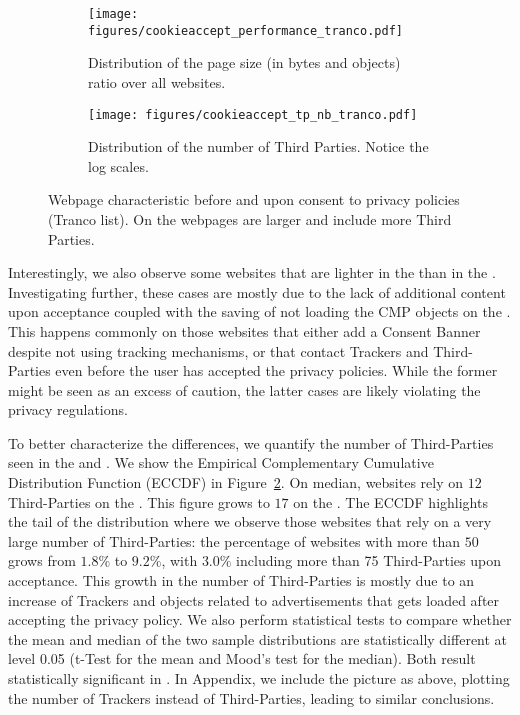 \begin{figure}[!t]
    \centering
    \begin{subfigure}[t]{0.495\columnwidth}
        \texttt{[image: figures/cookieaccept\_performance\_tranco.pdf]}
        \caption{Distribution of the page size (in bytes and objects) ratio over all websites.}
        \label{fig:ca_perf_size}
    \end{subfigure}
    \begin{subfigure}[t]{0.495\columnwidth}
        \texttt{[image: figures/cookieaccept\_tp\_nb\_tranco.pdf]}
        \caption{Distribution of the number of Third Parties. Notice the log scales.}
        \label{fig:ca_perf_tp}
    \end{subfigure}
	\caption{Webpage characteristic before and upon consent to privacy policies (Tranco list). On the \AFTER webpages are larger and include more Third Parties.}
	\label{fig:ca_perf}
\end{figure}

Interestingly, we also observe some websites that are lighter in the \AFTER than in the \BEFORE. Investigating further, these cases are mostly due to the lack of additional content upon acceptance coupled with the saving of not loading the CMP objects on the \AFTER. This happens commonly on those websites that either add a Consent Banner despite not using tracking mechanisms, or that contact Trackers and Third-Parties even before the user has accepted the privacy policies. While the former might be seen as an excess of caution, the latter cases are likely violating the privacy regulations.

To better characterize the differences, we quantify the number of Third-Parties seen in the \BEFORE and \AFTER. We show the Empirical Complementary Cumulative Distribution Function (ECCDF) in Figure~\ref{fig:ca_perf_tp}. On median, websites rely on $12$ Third-Parties on the \BEFORE. This figure grows to $17$ on the \AFTER. The ECCDF highlights the tail of the distribution where we observe those websites that rely on a very large number of Third-Parties: the percentage of websites with more than $50$ grows from $1.8\%$ to $9.2\%$, with $3.0\%$ including more than 75 Third-Parties upon acceptance. This growth in the number of Third-Parties is mostly due to an increase of Trackers and objects related to advertisements that gets loaded after accepting the privacy policy. 
We also perform statistical tests to compare whether the mean and median of the two sample distributions are statistically different at level 0.05 (t-Test for the mean and Mood’s test for the median). Both result statistically significant in \AFTER. 
In Appendix, we include the picture as above, plotting the number of Trackers instead of Third-Parties, leading to similar conclusions.

